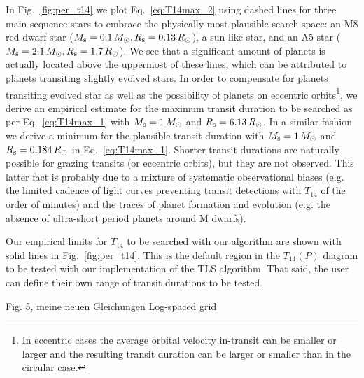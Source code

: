 \documentclass[twocolumn,tighten,longauthor]{myaastex62}
\begin{document}
In Fig.~\ref{fig:per_t14} we plot Eq.~\eqref{eq:T14max_2} using dashed lines for three main-sequence stars to embrace the physically most plausible search space: an M8 red dwarf star ($M_{\rm s}=0.1\,M_\odot, R_{\rm s}=0.13\,R_\odot$), a sun-like star, and an A5 star ($M_{\rm s}=2.1\,M_\odot, R_{\rm s}=1.7\,R_\odot$). We see that a significant amount of planets is actually located above the uppermost of these lines, which can be attributed to planets transiting slightly evolved stars. In order to compensate for planets transiting evolved star as well as the possibility of planets on eccentric orbits\footnote{In eccentric cases the average orbital velocity in-transit can be smaller or larger and the resulting transit duration can be larger or smaller than in the circular case.}, we derive an empirical estimate for the maximum transit duration to be searched as per Eq.~\eqref{eq:T14max_1} with $M_{\rm s}=1\,M_\odot$ and $R_{\rm s}=6.13\,R_\odot$. In a similar fashion we derive a minimum for the plausible transit duration with $M_{\rm s}=1\,M_\odot$ and $R_{\rm s}=0.184\,R_\odot$ in Eq.~\eqref{eq:T14max_1}. Shorter transit durations are naturally possible for grazing transits (or eccentric orbits), but they are not observed. This latter fact is probably due to a mixture of systematic observational biases (e.g. the limited cadence of light curves preventing transit detections with $T_{14}$ of the order of minutes) and the traces of planet formation and evolution (e.g. the absence of ultra-short period planets around M dwarfs).

Our empirical limits for $T_{14}$ to be searched with our algorithm are shown with solid lines in Fig.~\ref{fig:per_t14}. This is the default region in the $T_{14}(P)$ diagram to be tested with our implementation of the TLS algorithm. That said, the user can define their own range of transit durations to be tested.

Fig. 5, meine neuen Gleichungen
Log-spaced grid
\end{document}
